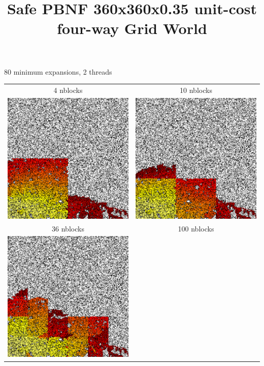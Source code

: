 \documentclass{article}
\title{Safe PBNF 360x360x0.35 unit-cost four-way Grid World}
\date{}
\begin{document}
\maketitle

\begin{center}
80 minimum expansions, 2 threads
\begin{tabular}{cc}
4 nblocks & 10 nblocks \\
\includegraphics[width=3.2in]{safepbnf-80min-2threads-4nblocks-unit-four-035-360-360}
&
\includegraphics[width=3.2in]{safepbnf-80min-2threads-10nblocks-unit-four-035-360-360}
\\
36 nblocks & 100 nblocks \\
\includegraphics[width=3.2in]{safepbnf-80min-2threads-36nblocks-unit-four-035-360-360}

\end{tabular}
\end{center}
\end{document}
